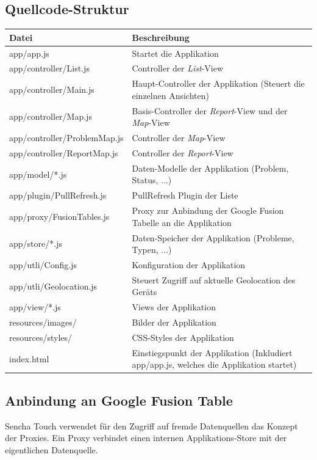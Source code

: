\subsection{Quellcode-Struktur}

\begin{longtable}{|l|p{10cm}|}
\hline 
\textbf{Datei} & \textbf{Beschreibung} \\ 
\hline 
app/app.js & Startet die Applikation \\ 
\hline 
app/controller/List.js & Controller der \emph{List}-View \\ 
\hline 
app/controller/Main.js & Haupt-Controller der Applikation (Steuert die einzelnen Ansichten) \\ 
\hline 
app/controller/Map.js & Basis-Controller der \emph{Report}-View und der \emph{Map}-View \\ 
\hline 
app/controller/ProblemMap.js & Controller der \emph{Map}-View \\ 
\hline 
app/controller/ReportMap.js & Controller der \emph{Report}-View \\ 
\hline 
app/model/*.js & Daten-Modelle der Applikation (Problem, Status, ...) \\ 
\hline 
app/plugin/PullRefresh.js & PullRefresh Plugin der Liste \\ 
\hline 
app/proxy/FusionTables.js & Proxy zur Anbindung der Google Fusion Tabelle an die Applikation \\ 
\hline 
app/store/*.js & Daten-Speicher der Applikation (Probleme, Typen, ...) \\ 
\hline 
app/utli/Config.js & Konfiguration der Applikation \\ 
\hline 
app/utli/Geolocation.js & Steuert Zugriff auf aktuelle Geolocation des Geräts \\ 
\hline 
app/view/*.js & Views der Applikation \\ 
\hline 
resources/images/ & Bilder der Applikation \\ 
\hline 
resources/styles/ & CSS-Styles der Applikation \\ 
\hline 
index.html & Einstiegspunkt der Applikation (Inkludiert app/app.js, welches die Applikation startet) \\ 
\hline
\end{longtable} 

\subsection{Anbindung an Google Fusion Table}
Sencha Touch verwendet für den Zugriff auf fremde Datenquellen das Konzept der Proxies. Ein Proxy verbindet einen internen Applikations-Store mit der eigentlichen Datenquelle.


